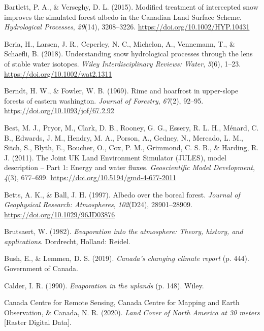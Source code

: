 \documentclass[
  letterpaper,
]{tex/uofsthesis-cs}
\newlength{\cslhangindent}
\newenvironment{CSLReferences}[2] %
 {\begin{list}{}{%
  \setlength{\itemindent}{0pt}
  \setlength{\leftmargin}{0pt}
  \setlength{\parsep}{0pt}
  \ifodd #1
   \setlength{\leftmargin}{\cslhangindent}
   \setlength{\itemindent}{-1\cslhangindent}
  \fi
  \setlength{\itemsep}{#2\baselineskip}}}
 {\end{list}}
\begin{document}
\begin{CSLReferences}{1}{0}
Bartlett, P. A., \& Verseghy, D. L. (2015). Modified treatment of
intercepted snow improves the simulated forest albedo in the {Canadian
Land Surface Scheme}. \emph{Hydrological Processes}, \emph{29}(14),
3208--3226. \url{https://doi.org/10.1002/HYP.10431}

Beria, H., Larsen, J. R., Ceperley, N. C., Michelon, A., Vennemann, T.,
\& Schaefli, B. (2018). Understanding snow hydrological processes
through the lens of stable water isotopes. \emph{Wiley Interdisciplinary
Reviews: Water}, \emph{5}(6), 1--23.
\url{https://doi.org/10.1002/wat2.1311}

Berndt, H. W., \& Fowler, W. B. (1969). Rime and hoarfrost in
upper-slope forests of eastern washington. \emph{Journal of Forestry},
\emph{67}(2), 92--95. \url{https://doi.org/10.1093/jof/67.2.92}

Best, M. J., Pryor, M., Clark, D. B., Rooney, G. G., Essery, R. L. H.,
Ménard, C. B., Edwards, J. M., Hendry, M. A., Porson, A., Gedney, N.,
Mercado, L. M., Sitch, S., Blyth, E., Boucher, O., Cox, P. M., Grimmond,
C. S. B., \& Harding, R. J. (2011). The {Joint UK Land Environment
Simulator} ({JULES}), model description -- {Part} 1: {Energy} and water
fluxes. \emph{Geoscientific Model Development}, \emph{4}(3), 677--699.
\url{https://doi.org/10.5194/gmd-4-677-2011}

Betts, A. K., \& Ball, J. H. (1997). Albedo over the boreal forest.
\emph{Journal of Geophysical Research: Atmospheres}, \emph{102}(D24),
28901--28909. \url{https://doi.org/10.1029/96JD03876}

Brutsaert, W. (1982). \emph{Evaporation into the atmosphere: Theory,
history, and applications}. Dordrecht, Holland: Reidel.

Bush, E., \& Lemmen, D. S. (2019). \emph{Canada's changing climate
report} (p. 444). Government of Canada.

Calder, I. R. (1990). \emph{Evaporation in the uplands} (p. 148). Wiley.

Canada Centre for Remote Sensing, Canada Centre for Mapping and Earth
Observation, \& Canada, N. R. (2020). \emph{Land {Cover} of {North
America} at 30 meters} {[}Raster Digital Data{]}.


\end{CSLReferences}
\end{document}
